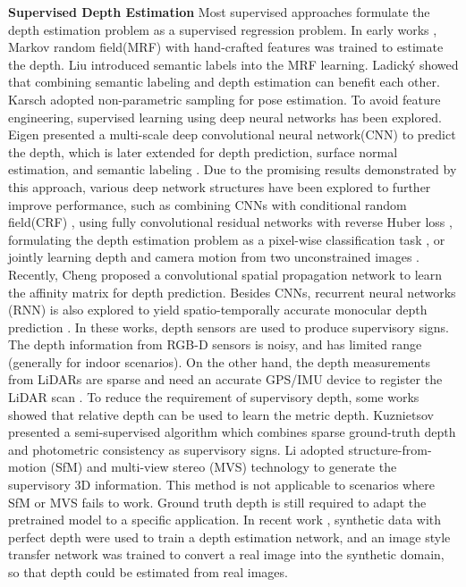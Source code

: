 \documentclass[10pt,twocolumn,letterpaper]{article}
\begin{document}
\noindent
\textbf{Supervised Depth Estimation}   Most supervised approaches formulate the depth estimation problem as a supervised regression problem. In early works \cite{saxena2006learning,saxena2009make3d}, Markov random field(MRF) with hand-crafted features was trained to estimate the depth. Liu \etal \cite{liu2010single} introduced semantic labels into the MRF learning. Ladick\'y \etal \cite{ladicky2014pulling} showed that combining semantic labeling and depth estimation can benefit each other.  Karsch \etal \cite{karsch2014depth} adopted non-parametric sampling for pose estimation. To avoid feature engineering, supervised learning using deep neural networks has been explored.   Eigen \etal \cite{EigenDepth} presented a multi-scale  deep convolutional neural network(CNN) to predict the depth, which is later extended for depth prediction, surface normal estimation, and semantic labeling \cite{eigen2015predicting}. Due to the promising results demonstrated by this approach, various deep network structures have been explored to further improve performance, such as combining CNNs with conditional random field(CRF) \cite{li2015depth,liu2015deep,wang2015towards,liu2016learning}, using fully convolutional residual networks with reverse Huber loss \cite{laina2016deeper}, formulating the depth estimation problem as a pixel-wise classification task \cite{cao2017estimating}, or jointly learning depth and camera motion from two unconstrained images \cite{ummenhofer2017demon}. Recently, Cheng \etal \cite{cheng2018depth} proposed a convolutional spatial propagation network to learn the affinity matrix for depth prediction. Besides CNNs, recurrent neural networks (RNN) is also explored to yield spatio-temporally accurate monocular depth prediction \cite{kumar2018depthnet}.     In these works, depth sensors are used to produce supervisory signs.  The depth information from RGB-D sensors is noisy, and has limited range (generally for indoor scenarios). On the other hand, the depth measurements from LiDARs are sparse and need an accurate GPS/IMU device to register the LiDAR scan \cite{Geiger2012CVPR}. To reduce the requirement of supervisory depth, some works \cite{zoran2015learning,chen2016single} showed that relative depth can be used to  learn the metric depth. Kuznietsov \etal \cite{kuznietsov2017semi} presented a semi-supervised algorithm which combines sparse ground-truth depth and photometric consistency as supervisory signs.      Li \etal \cite{li2018megadepth} adopted structure-from-motion (SfM)  and multi-view stereo (MVS) technology to generate the supervisory 3D information.  This method is not applicable to scenarios where SfM or MVS  fails to work. Ground truth depth  is still required to adapt the pretrained model to a specific application. In recent work \cite{atapour2018real}, synthetic data with perfect depth were used to train a depth estimation network, and an image style transfer network was trained to convert a real image into the synthetic domain, so that depth could be estimated from real images.
\end{document}
